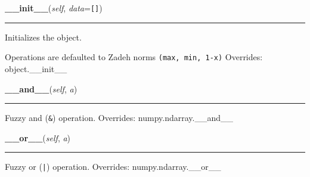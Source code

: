    \vspace{0.5ex}

\hspace{.8\funcindent}\begin{boxedminipage}{\funcwidth}

    \raggedright \textbf{\_\_init\_\_}(\textit{self}, \textit{data}={\tt \texttt{[}\texttt{]}})

    \vspace{-1.5ex}

    \rule{\textwidth}{0.5\fboxrule}
\setlength{\parskip}{2ex}

Initializes the object.

Operations are defaulted to Zadeh norms \texttt{(max, min, 1-x)}
\setlength{\parskip}{1ex}
      Overrides: object.\_\_init\_\_

    \end{boxedminipage}

    \vspace{0.5ex}

\hspace{.8\funcindent}\begin{boxedminipage}{\funcwidth}

    \raggedright \textbf{\_\_and\_\_}(\textit{self}, \textit{a})

    \vspace{-1.5ex}

    \rule{\textwidth}{0.5\fboxrule}
\setlength{\parskip}{2ex}

Fuzzy and (\texttt{\&}) operation.
\setlength{\parskip}{1ex}
      Overrides: numpy.ndarray.\_\_and\_\_

    \end{boxedminipage}

    \vspace{0.5ex}

\hspace{.8\funcindent}\begin{boxedminipage}{\funcwidth}

    \raggedright \textbf{\_\_or\_\_}(\textit{self}, \textit{a})

    \vspace{-1.5ex}

    \rule{\textwidth}{0.5\fboxrule}
\setlength{\parskip}{2ex}

Fuzzy or (\texttt{|}) operation.
\setlength{\parskip}{1ex}
      Overrides: numpy.ndarray.\_\_or\_\_

    \end{boxedminipage}

